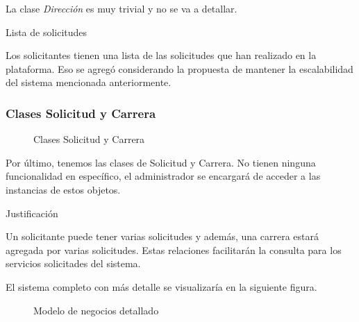 \documentclass[12pt,a4paper]{article}
\newcommand{\concept}[2]{%
    \begin{conceptbox}{#1}
    #2
    \end{conceptbox}
}
\begin{document}
La clase \textit{Dirección} es muy trivial y no se va a detallar.

\concept{Lista de solicitudes}{
  Los solicitantes tienen una lista de las solicitudes que han realizado en la plataforma. Eso se agregó considerando la propuesta de mantener la escalabilidad del sistema mencionada anteriormente.
}

\subsubsection*{Clases Solicitud y Carrera}

\begin{figure}[H]
  \centering
  \caption{Clases Solicitud y Carrera}
  \label{fig:ClaseSoliCarr}
\end{figure}

Por último, tenemos las clases de Solicitud y Carrera. No tienen ninguna funcionalidad en específico, el administrador se encargará de acceder a las instancias de estos objetos.

\concept{Justificación}{
  Un solicitante puede tener varias solicitudes y además, una carrera estará agregada por varias solicitudes. Estas relaciones facilitarán la consulta para los servicios solicitades del sistema.
}

El sistema completo con más detalle se visualizaría en la siguiente figura.

\begin{figure}[H]
  \centering
  \caption{Modelo de negocios detallado}
  \label{fig:ModeloNegDetallado}
\end{figure}
\end{document}
